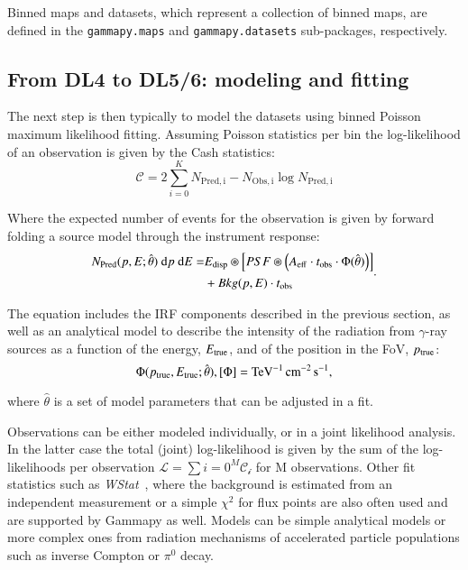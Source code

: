 \documentclass[longauth]{aa}
\newcommand{\code}[1]{\texttt{#1}}
\newcommand{\gammapy}{Gammapy\xspace}
\newcommand{\gammaray}{$\gamma$-ray\xspace}
\begin{document}
Binned maps and datasets, which represent a collection of binned
maps, are defined in the \code{gammapy.maps} and \code{gammapy.datasets}
sub-packages, respectively. 


\subsection{From DL4 to DL5/6: modeling and fitting}
The next step is then typically to model the datasets using binned Poisson maximum likelihood fitting.
Assuming Poisson statistics per bin the log-likelihood of an observation is given by the Cash statistics\citep{Cash}:
%
\begin{equation}
        \mathcal{C} = 2 \sum_{i=0}^K N_{\mathrm{Pred, i}} - N_{\mathrm{Obs, i}} \log{N_{\mathrm{Pred, i}}} 
\end{equation}

Where the expected number of events for the observation is given by forward folding a source model through
the instrument response:
 \begin{equation}
         \begin{split}
                N_{\mathrm{Pred}}(p, E; \hat{\theta})\ {\rm d}p\ {\rm d}E =  &E_{\rm disp} \circledast \left[ PSF \circledast \left( A_{\rm eff} \cdot t_{\rm obs} \cdot \Phi(\hat{\theta}) \right) \right]\\
                                                & + Bkg(p, E) \cdot t_{\rm obs}
         \end{split}
 .\end{equation}

The equation includes the IRF components described in the previous section, as well as an analytical model to describe the
intensity of the radiation from \gammaray sources as a function of the energy, $E_{\rm true}$,
and of the position in the FoV, $p_{\rm true}$:
%
\begin{equation}
    \Phi(p_{\rm true}, E_{\rm true}; \hat{\theta}), [\Phi] = \si{TeV^{-1}.cm^{-2}.s^{-1}}
    \label{eq:general_source_model}
,\end{equation}

where $\hat{\theta}$ is a set of model parameters that can be adjusted in a fit.

Observations can be either modeled individually, or in a joint likelihood analysis.
In the latter case the total (joint) log-likelihood is given by the sum of the log-likelihoods
per observation $\mathcal{L} = \sum{i=0}^M \mathcal{C_i}$ for M observations. Other fit
statistics such as \emph{WStat}~\citep{WStat}, where the background is estimated from an independent
measurement or a simple $\chi^2$ for flux points are also often used
and are supported by \gammapy as well. Models can be simple analytical models or more complex
ones from radiation mechanisms of accelerated particle populations such as inverse Compton or $\pi^{0}$ decay.
\end{document}
